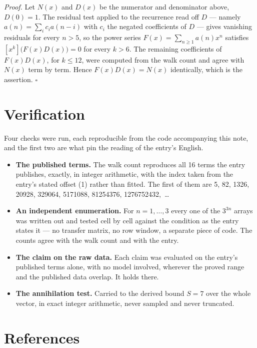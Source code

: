 \documentclass[11pt]{article}
\theoremstyle{definition}
\begin{document}
{\itshape Proof.} Let $N(x)$ and $D(x)$ be the numerator and denominator above, $D(0)=1$. The residual test applied to the recurrence read off $D$ --- namely $a(n) = \sum_i c_i a(n-i)$ with $c_i$ the negated coefficients of $D$ --- gives vanishing residuals for every $n > 5$, so the power series $F(x)=\sum_{n\ge 1}a(n)x^n$ satisfies $[x^k]\bigl(F(x)D(x)\bigr) = 0$ for every $k > 6$. The remaining coefficients of $F(x)D(x)$, for $k \le 12$, were computed from the walk count and agree with $N(x)$ term by term. Hence $F(x)D(x) = N(x)$ identically, which is the assertion. $\square$

\section{Verification}

Four checks were run, each reproducible from the code accompanying this note, and the first two are what pin the reading of the entry's English.

\begin{itemize}

\item {\bfseries The published terms.} The walk count reproduces all 16 terms the entry publishes, exactly, in integer arithmetic, with the index taken from the entry's stated offset (1) rather than fitted. The first of them are 5, 82, 1326, 20928, 329064, 5171088, 81254376, 1276752432,~\dots

\item {\bfseries An independent enumeration.} For $n = 1,\dots,3$ every one of the $3^{3n}$ arrays was written out and tested cell by cell against the condition as the entry states it --- no transfer matrix, no row window, a separate piece of code. The counts agree with the walk count and with the entry.

\item {\bfseries The claim on the raw data.} Each claim was evaluated on the entry's published terms alone, with no model involved, wherever the proved range and the published data overlap. It holds there.

\item {\bfseries The annihilation test.} Carried to the derived bound $S = 7$ over the whole vector, in exact integer arithmetic, never sampled and never truncated.

\end{itemize}

\section{References}
\end{document}
